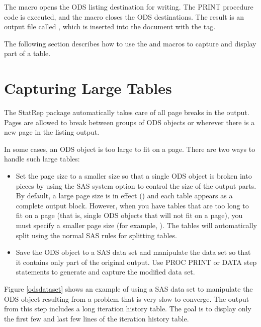 \documentclass[article,oneside]{memoir}
\newcommand*{\StatRep}{\textsf{StatRep}\xspace}
\begin{document}
  The  macro opens the ODS listing destination for writing.
  The PRINT procedure code is executed, and the  macro closes the ODS destinations.
  The result is an output file called , which is
  inserted into the document with the  tag.

  The following section describes how to use the  and 
  macros to capture and display part of a table.

\section{Capturing Large Tables}\label{large}

  The \StatRep package automatically takes care of all page breaks in the output.
  Pages are allowed to break between groups of ODS objects or wherever there is a new page
  in the listing output.

  In some cases, an ODS object is too large to fit on a page.
  There are two ways to handle such large tables:
  \begin{itemize}
  \item Set the page size to a smaller size so that a single ODS object is broken into pieces
  by using the SAS system option to control the size of the output parts.
  By default, a large page size is
  in effect () and each table appears
  as a complete output block. However, when you have tables that are
  too long to fit on a page (that is, single ODS objects that will not fit on a page),
  you must specify a smaller page size
  (for example, ).
  The tables will automatically split using the normal SAS
  rules for splitting tables.

  \item Save the ODS object to a SAS data set and manipulate the data set
  so that it contains only part of the original output. Use PROC PRINT
  or DATA step statements to generate and capture the modified data set.

  \end{itemize}

  Figure \ref{odsdataset} shows an
  example of using a SAS data set to manipulate
  the ODS object resulting from a problem that is very
  slow to converge. The output from this step includes a long iteration
  history table.
  The goal is to display only the first few and last few lines of
  the iteration history table.
\end{document}
